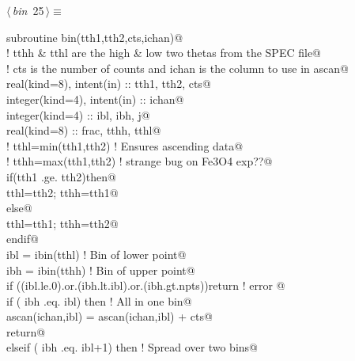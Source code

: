\documentclass[10pt,a4paper,notitlepage]{article}
\begin{document}
\begin{flushleft} \small
\begin{minipage}{\linewidth}\label{scrap29}\raggedright\small
{} $\langle\,${\it bin}\nobreak\ {\footnotesize {25}}$\,\rangle\equiv$
\vspace{-1ex}
\begin{list}{}{} \item
\mbox{}\verb@      subroutine bin(tth1,tth2,cts,ichan)@\\
\mbox{}\verb@! tthh & tthl are the high & low two thetas from the SPEC file@\\
\mbox{}\verb@! cts is the number of counts and ichan is the column to use in ascan@\\
\mbox{}\verb@      real(kind=8), intent(in) :: tth1, tth2, cts@\\
\mbox{}\verb@      integer(kind=4), intent(in) :: ichan@\\
\mbox{}\verb@      integer(kind=4) :: ibl, ibh, j@\\
\mbox{}\verb@      real(kind=8) :: frac, tthh, tthl@\\
\mbox{}\verb@!      tthl=min(tth1,tth2)                       ! Ensures ascending data@\\
\mbox{}\verb@!      tthh=max(tth1,tth2)    ! strange bug on Fe3O4 exp??@\\
\mbox{}\verb@      if(tth1 .ge. tth2)then@\\
\mbox{}\verb@        tthl=tth2; tthh=tth1@\\
\mbox{}\verb@      else@\\
\mbox{}\verb@        tthl=tth1; tthh=tth2@\\
\mbox{}\verb@      endif@\\
\mbox{}\verb@      ibl = ibin(tthl)                              ! Bin of lower point@\\
\mbox{}\verb@      ibh = ibin(tthh)                              ! Bin of upper point@\\
\mbox{}\verb@      if ((ibl.le.0).or.(ibh.lt.ibl).or.(ibh.gt.npts))return     ! error   @\\
\mbox{}\verb@      if ( ibh .eq. ibl) then                           ! All in one bin@\\
\mbox{}\verb@         ascan(ichan,ibl) = ascan(ichan,ibl) + cts@\\
\mbox{}\verb@         return@\\
\mbox{}\verb@      elseif ( ibh .eq. ibl+1) then               ! Spread over two bins@\\

\end{list}
\end{minipage}
\end{flushleft}
\end{document}
